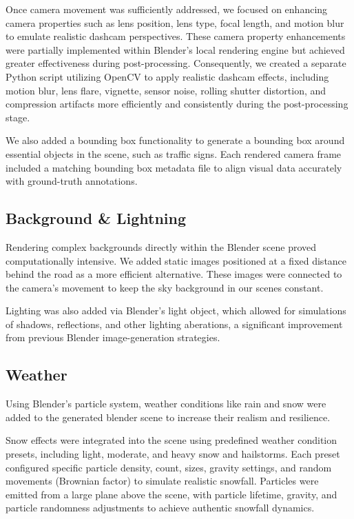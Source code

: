\documentclass[journal]{IEEEtran}
\begin{document}
Once camera movement was sufficiently addressed, we focused on enhancing camera properties such as lens position, lens type, focal length, and motion blur to emulate realistic dashcam perspectives. These camera property enhancements were partially implemented within Blender's local rendering engine but achieved greater effectiveness during post-processing. Consequently, we created a separate Python script utilizing OpenCV to apply realistic dashcam effects, including motion blur, lens flare, vignette, sensor noise, rolling shutter distortion, and compression artifacts more efficiently and consistently during the post-processing stage.

We also added a bounding box functionality to generate a bounding box around essential objects in the scene, such as traffic signs. Each rendered camera frame included a matching bounding box metadata file to align visual data accurately with ground-truth annotations.

\subsection{Background \& Lightning}
Rendering complex backgrounds directly within the Blender scene proved computationally intensive. We added static images positioned at a fixed distance behind the road as a more efficient alternative. These images were connected to the camera's movement to keep the sky background in our scenes constant.

Lighting was also added via Blender's light object, which allowed for simulations of shadows, reflections, and other lighting aberations, a significant improvement from previous Blender image-generation strategies\cite{blender_paper}. 

\subsection{Weather}
Using Blender's particle system, weather conditions like rain and snow were added to the generated blender scene to increase their realism and resilience.

Snow effects were integrated into the scene using predefined weather condition presets, including light, moderate, and heavy snow and hailstorms. Each preset configured specific particle density, count, sizes, gravity settings, and random movements (Brownian factor) to simulate realistic snowfall. Particles were emitted from a large plane above the scene, with particle lifetime, gravity, and particle randomness adjustments to achieve authentic snowfall dynamics.
\end{document}
